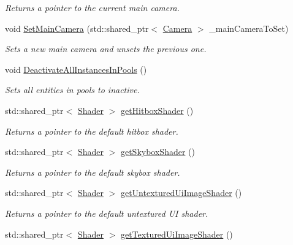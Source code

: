 \begin{DoxyCompactItemize}
\begin{DoxyCompactList}\small\item\em Returns a pointer to the current main camera. \end{DoxyCompactList}\item 
void \hyperlink{classfrontier_1_1_core_a601db94399406b9091a76972d948dc6b}{Set\+Main\+Camera} (std\+::shared\+\_\+ptr$<$ \hyperlink{classfrontier_1_1_camera}{Camera} $>$ \+\_\+main\+Camera\+To\+Set)
\begin{DoxyCompactList}\small\item\em Sets a new main camera and unsets the previous one. \end{DoxyCompactList}\item 
void \hyperlink{classfrontier_1_1_core_a10aea6f8fa81b54595845386c3d3f6cf}{Deactivate\+All\+Instances\+In\+Pools} ()
\begin{DoxyCompactList}\small\item\em Sets all entities in pools to inactive. \end{DoxyCompactList}\item 
std\+::shared\+\_\+ptr$<$ \hyperlink{classfrontier_1_1_shader}{Shader} $>$ \hyperlink{classfrontier_1_1_core_a5c92add403b305f061f691d9c21d63c0}{get\+Hitbox\+Shader} ()
\begin{DoxyCompactList}\small\item\em Returns a pointer to the default hitbox shader. \end{DoxyCompactList}\item 
std\+::shared\+\_\+ptr$<$ \hyperlink{classfrontier_1_1_shader}{Shader} $>$ \hyperlink{classfrontier_1_1_core_a0da8b576b0d812148924827da5c05a3d}{get\+Skybox\+Shader} ()
\begin{DoxyCompactList}\small\item\em Returns a pointer to the default skybox shader. \end{DoxyCompactList}\item 
std\+::shared\+\_\+ptr$<$ \hyperlink{classfrontier_1_1_shader}{Shader} $>$ \hyperlink{classfrontier_1_1_core_a6b61c169b75acd9a15bf3009bc838901}{get\+Untextured\+Ui\+Image\+Shader} ()
\begin{DoxyCompactList}\small\item\em Returns a pointer to the default untextured UI shader. \end{DoxyCompactList}\item 
std\+::shared\+\_\+ptr$<$ \hyperlink{classfrontier_1_1_shader}{Shader} $>$ \hyperlink{classfrontier_1_1_core_aac07a29176bd8056e004f7be8c919d3f}{get\+Textured\+Ui\+Image\+Shader} ()

\end{DoxyCompactItemize}
